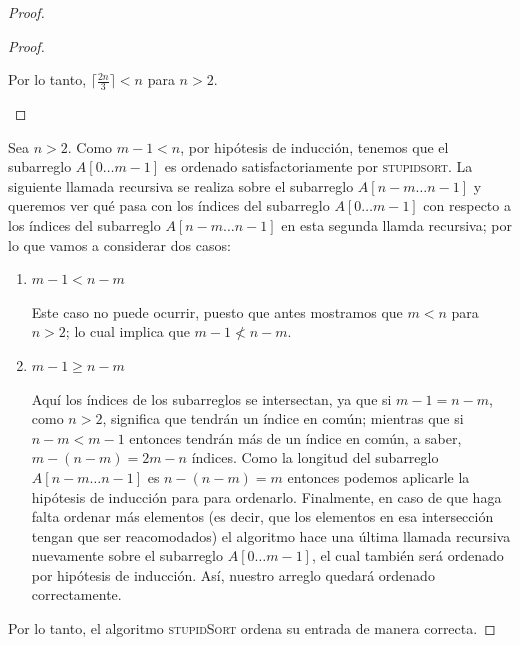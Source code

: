 \documentclass[letterpaper,11pt]{article}
\begin{document}
\begin{enumerate}
\begin{enumerate}
\begin{proof}
\begin{itemize}
\begin{proof}
\begin{itemize}
                        Por lo tanto, $\lceil \frac{2n}{3} \rceil < n$ para
                        $n > 2$.
                    \end{itemize}
                \end{proof}

                Sea $n > 2$. Como $m - 1 < n$, por hipótesis de inducción, tenemos 
                que el subarreglo $A[0 \ldots m-1]$ es ordenado satisfactoriamente 
                por \textsc{stupidsort}. La siguiente llamada recursiva se realiza 
                sobre el subarreglo $A[n-m \ldots n-1]$ y queremos ver qué pasa 
                con los índices del subarreglo $A[0 \ldots m-1]$ con respecto a los 
                índices del subarreglo $A[n-m \ldots n-1]$ en esta segunda llamda 
                recursiva; por lo que vamos a considerar dos casos:
                \begin{enumerate}
                    \item $m - 1 < n - m$

                    Este caso no puede ocurrir, puesto que antes mostramos que 
                    $m < n$ para $n > 2$; lo cual implica que $m - 1 \not < n - m$.

                    \item $m - 1 \geq n - m$

                    Aquí los índices de los subarreglos se intersectan, ya que
                    si $m - 1 = n - m$, como $n > 2$, significa que tendrán un 
                    índice en común; mientras que si $n - m < m - 1$ entonces 
                    tendrán más de un índice en común, a saber, $m-(n-m) = 2m - n$
                    índices. Como la longitud del subarreglo $A[n-m \ldots n-1]$ 
                    es $n - (n - m) = m$ entonces podemos aplicarle la hipótesis 
                    de inducción para para ordenarlo. Finalmente, en caso de que 
                    haga falta ordenar más elementos (es decir, que los elementos 
                    en esa intersección tengan que ser reacomodados) el algoritmo 
                    hace una última llamada recursiva nuevamente sobre el 
                    subarreglo $A[0 \ldots m-1]$, el cual también será ordenado 
                    por hipótesis de inducción. Así, nuestro arreglo quedará 
                    ordenado correctamente.
                \end{enumerate}
            \end{itemize}

            Por lo tanto, el algoritmo \textsc{stupidSort} ordena su entrada de 
            manera correcta.


\end{proof}
\end{enumerate}
\end{enumerate}
\end{document}
